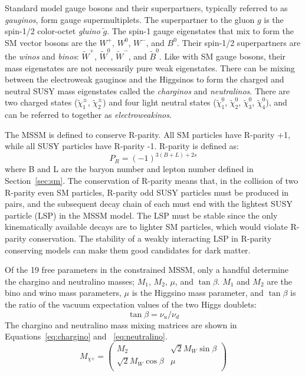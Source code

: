 Standard model gauge bosons and their superpartners, typically referred to as \textit{gauginos}, form gauge supermultiplets.  The superpartner to the gluon $g$ is the spin-1/2 color-octet \textit{gluino} $\tilde{g}$.  The spin-1 gauge eigenstates that mix to form the SM vector bosons are the $W^+$, $W^0$, $W^-$, and $B^0$.  Their spin-1/2 superpartners are the \textit{winos} and \textit{binos}: $\tilde{W}^+$, $\tilde{W}^0$, $\tilde{W}^-$, and $\tilde{B}^0$.  Like with SM gauge bosons, their mass eigenstates are not necessarily pure weak eigenstates.  There can be mixing between the electroweak gauginos and the Higgsinos to form the charged and neutral SUSY mass eigenstates called the \textit{charginos} and \textit{neutralinos}.  There are two charged states ($\tilde\chi_1^\pm$, $\tilde\chi_2^\pm$) and four light neutral states ($\tilde\chi_1^0$, $\tilde\chi_2^0$, $\tilde\chi_3^0$, $\tilde\chi_4^0$), and can be referred to together as \textit{electroweakinos}.
  
The MSSM is defined to conserve R-parity.  All SM particles have R-parity +1, while all SUSY particles have R-parity -1.  R-parity is defined as:
\begin{equation}
 P_R=(-1)^{3(B+L)+2s}
 \end{equation}
 where B and L are the baryon number and lepton number defined in Section~\ref{sec:sm}.  The conservation of R-parity means that, in the collision of two R-parity even SM particles, R-parity odd SUSY particles must be produced in pairs, and the subsequent decay chain of each must end with the lightest SUSY particle (LSP) in the MSSM model.  The LSP must be stable since the only kinematically available decays are to lighter SM particles, which would violate R-parity conservation.  The stability of a weakly interacting LSP in R-parity conserving models can make them good candidates for dark matter.  

Of the 19 free parameters in the constrained MSSM, only a handful determine the chargino and neutralino masses; $M_1$, $M_2$, $\mu$, and $\tan\beta$.  $M_1$ and $M_2$ are the bino and wino mass parameters, $\mu$ is the Higgsino mass parameter, and $\tan\beta$ is the ratio of the vacuum expectation values of the two Higgs doublets:
\begin{equation}
\tan\beta=\nu_u/\nu_d
\end{equation}
The chargino and neutralino mass mixing matrices are shown in Equations~\ref{eq:chargino} and ~\ref{eq:neutralino}.
\begin{equation}
M_{\chi^\pm}=
\begin{pmatrix}
M_2 & \sqrt{2}M_W\sin\beta \\
\sqrt{2}M_W\cos\beta & \mu \\
\end{pmatrix}
\label{eq:chargino}
\end{equation}

